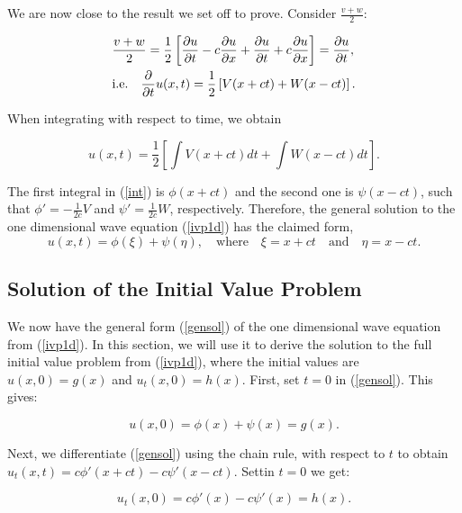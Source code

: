 \documentclass[a4paper, 12pt]{article}
\numberwithin{equation}{section}
\begin{document}
We are now close to the result we set off to prove. Consider $\frac{v+w}{2}$:

\begin{equation*}
    \begin{aligned}
    &\frac{v+w}{2}=\frac{1}{2}\left[\diffp[1]{u}{t}-c\diffp[1]{u}{x}+\diffp[1]{u}{t}+c\diffp[1]{u}{x}\right]=\diffp[1]{u}{t},\\
    &\textrm{i.e.} \quad \diffp[1]{}{t}u(x, t)=\frac{1}{2}\left[V(x+ct)+W(x-ct)\right].
    \end{aligned}
\end{equation*}

When integrating with respect to time, we obtain

\begin{equation} \label{int}
    u(x,t)=\frac{1}{2}\left[\int{V(x+ct)dt}+\int{W(x-ct)dt}\right].
\end{equation}

The first integral in (\ref{int}) is $\phi(x+ct)$ and the second one is $\psi(x-ct)$, such that $\phi'=-\frac{1}{2c}V$ and $\psi'=\frac{1}{2c}W$, respectively.
Therefore, the general solution to the one dimensional wave equation (\ref{ivp1d}) has the claimed form, 
\begin{equation} \label{gensol}
    u(x, t)=\phi(\xi)+\psi(\eta), \quad \textrm{where} \quad \xi=x+ct \quad \textrm{and} \quad \eta=x-ct.
\end{equation}

\subsection{Solution of the Initial Value Problem}
We now have the general form (\ref{gensol}) of the one dimensional wave equation from (\ref{ivp1d}). In this section, we will use it to derive the solution to
the full initial value problem from (\ref{ivp1d}), where the initial values are $u(x,0)=g(x)$ and $u_t(x,0)=h(x)$. First, set $t=0$ in (\ref{gensol}). This gives:

\begin{equation} \label{t=0}
    u(x,0)=\phi(x)+\psi(x)=g(x).
\end{equation}

Next, we differentiate (\ref{gensol}) using the chain rule, with respect to $t$ to obtain $u_t(x,t)=c\phi'(x+ct)-c\psi'(x-ct)$. Settin $t=0$ we get:

\begin{equation} \label{ut=0}
    u_t(x,0)=c\phi'(x)-c\psi'(x)=h(x).
\end{equation}
\end{document}
